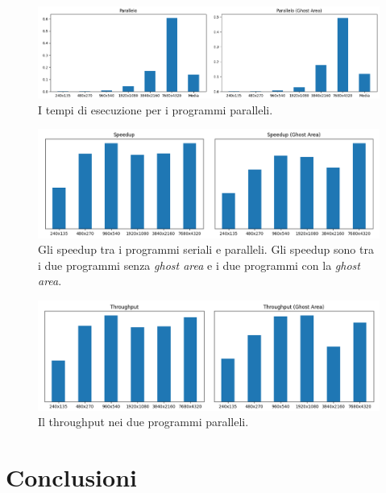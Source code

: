 \documentclass[12pt,a4paper,openright,twoside]{report}
\begin{document}
\begin{figure}[h]
    \centering
    \includegraphics[width=\textwidth]{graphs_parallel.png}
    \caption{I tempi di esecuzione per i programmi paralleli.}
    \label{img:times_par}
\end{figure}

\begin{figure}[h]
    \centering
    \includegraphics[width=\textwidth]{speedup.png}
    \caption[Gli Gli speedup tra i programmi seriali e paralleli.]{Gli speedup tra i programmi seriali e paralleli. Gli speedup sono tra i due programmi senza \textit{ghost area} e i due programmi con la \textit{ghost area}.}
    \label{img:speedup}
\end{figure}

\begin{figure}[h]
    \centering
    \includegraphics[width=\textwidth]{throughput.png}
    \caption{Il throughput nei due programmi paralleli.}
    \label{img:throughput}
\end{figure}

\chapter*{Conclusioni}

\end{document}
